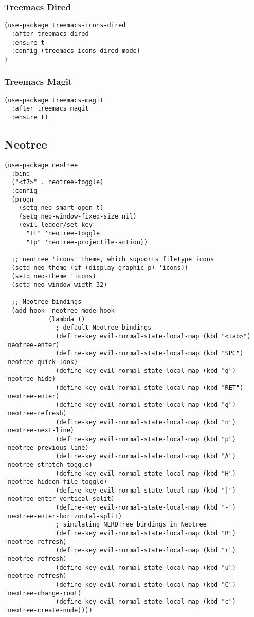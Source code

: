 \documentclass[11pt]{article}
\begin{document}
\subsubsection*{Treemacs Dired}
\label{sec:orgebc4169}
\begin{verbatim}
(use-package treemacs-icons-dired
  :after treemacs dired
  :ensure t
  :config (treemacs-icons-dired-mode)
)
\end{verbatim}

\subsubsection*{Treemacs Magit}
\label{sec:org40803f9}
\begin{verbatim}
(use-package treemacs-magit
  :after treemacs magit
  :ensure t)
\end{verbatim}

\subsection*{Neotree}
\label{sec:orge2d4e7b}

\begin{verbatim}
(use-package neotree
  :bind
  ("<f7>" . neotree-toggle)
  :config
  (progn
    (setq neo-smart-open t)
    (setq neo-window-fixed-size nil)
    (evil-leader/set-key
      "tt" 'neotree-toggle
      "tp" 'neotree-projectile-action))

  ;; neotree 'icons' theme, which supports filetype icons
  (setq neo-theme (if (display-graphic-p) 'icons))
  (setq neo-theme 'icons)
  (setq neo-window-width 32)

  ;; Neotree bindings
  (add-hook 'neotree-mode-hook
            (lambda ()
              ; default Neotree bindings
              (define-key evil-normal-state-local-map (kbd "<tab>") 'neotree-enter)
              (define-key evil-normal-state-local-map (kbd "SPC") 'neotree-quick-look)
              (define-key evil-normal-state-local-map (kbd "q") 'neotree-hide)
              (define-key evil-normal-state-local-map (kbd "RET") 'neotree-enter)
              (define-key evil-normal-state-local-map (kbd "g") 'neotree-refresh)
              (define-key evil-normal-state-local-map (kbd "n") 'neotree-next-line)
              (define-key evil-normal-state-local-map (kbd "p") 'neotree-previous-line)
              (define-key evil-normal-state-local-map (kbd "A") 'neotree-stretch-toggle)
              (define-key evil-normal-state-local-map (kbd "H") 'neotree-hidden-file-toggle)
              (define-key evil-normal-state-local-map (kbd "|") 'neotree-enter-vertical-split)
              (define-key evil-normal-state-local-map (kbd "-") 'neotree-enter-horizontal-split)
              ; simulating NERDTree bindings in Neotree
              (define-key evil-normal-state-local-map (kbd "R") 'neotree-refresh)
              (define-key evil-normal-state-local-map (kbd "r") 'neotree-refresh)
              (define-key evil-normal-state-local-map (kbd "u") 'neotree-refresh)
              (define-key evil-normal-state-local-map (kbd "C") 'neotree-change-root)
              (define-key evil-normal-state-local-map (kbd "c") 'neotree-create-node))))
\end{verbatim}
\end{document}
